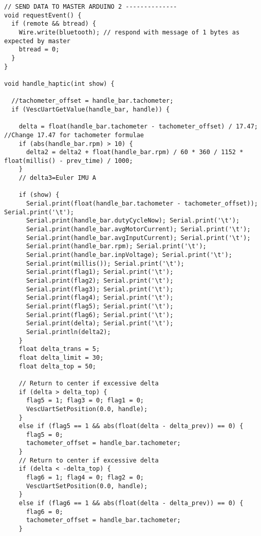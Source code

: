 \begin{lstlisting}[style=codearduino]
// SEND DATA TO MASTER ARDUINO 2 --------------
void requestEvent() {
  if (remote && btread) {
    Wire.write(bluetooth); // respond with message of 1 bytes as expected by master
    btread = 0;
  }
}

void handle_haptic(int show) {

  //tachometer_offset = handle_bar.tachometer;
  if (VescUartGetValue(handle_bar, handle)) {

    delta = float(handle_bar.tachometer - tachometer_offset) / 17.47; //Change 17.47 for tachometer formulae
    if (abs(handle_bar.rpm) > 10) {
      delta2 = delta2 + float(handle_bar.rpm) / 60 * 360 / 1152 * float(millis() - prev_time) / 1000;
    }
    // delta3=Euler IMU A

    if (show) {
      Serial.print(float(handle_bar.tachometer - tachometer_offset)); Serial.print('\t');
      Serial.print(handle_bar.dutyCycleNow); Serial.print('\t');
      Serial.print(handle_bar.avgMotorCurrent); Serial.print('\t');
      Serial.print(handle_bar.avgInputCurrent); Serial.print('\t');
      Serial.print(handle_bar.rpm); Serial.print('\t');
      Serial.print(handle_bar.inpVoltage); Serial.print('\t');
      Serial.print(millis()); Serial.print('\t');
      Serial.print(flag1); Serial.print('\t');
      Serial.print(flag2); Serial.print('\t');
      Serial.print(flag3); Serial.print('\t');
      Serial.print(flag4); Serial.print('\t');
      Serial.print(flag5); Serial.print('\t');
      Serial.print(flag6); Serial.print('\t');
      Serial.print(delta); Serial.print('\t');
      Serial.println(delta2);
    }
    float delta_trans = 5;
    float delta_limit = 30;
    float delta_top = 50;

    // Return to center if excessive delta
    if (delta > delta_top) {
      flag5 = 1; flag3 = 0; flag1 = 0;
      VescUartSetPosition(0.0, handle);
    }
    else if (flag5 == 1 && abs(float(delta - delta_prev)) == 0) {
      flag5 = 0;
      tachometer_offset = handle_bar.tachometer;
    }
    // Return to center if excessive delta
    if (delta < -delta_top) {
      flag6 = 1; flag4 = 0; flag2 = 0;
      VescUartSetPosition(0.0, handle);
    }
    else if (flag6 == 1 && abs(float(delta - delta_prev)) == 0) {
      flag6 = 0;
      tachometer_offset = handle_bar.tachometer;
    }


\end{lstlisting}
